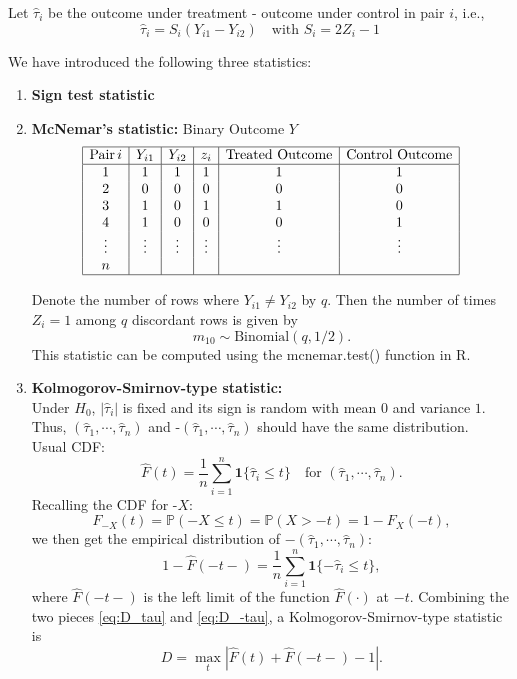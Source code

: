 Let $\hat\tau_i$ be the outcome under treatment - outcome under control in pair $i$, i.e.,
    \[
        \hat\tau_i = S_i (Y_{i1} - Y_{i2}) \quad\text{with }S_i = 2Z_i - 1
    \]

We have introduced the following three statistics:

\begin{enumerate}
    \item \textbf{Sign test statistic}
    
    \item \textbf{McNemar's statistic:} Binary Outcome $Y$
    \[
    \begin{array}{|c|c|c|c|c|c|}
    \hline
    \text{Pair} \, i & Y_{i1} & Y_{i2} & z_i & \text{Treated Outcome} & \text{Control Outcome} \\
    \hline
    1 & 1 & 1 & 1 & 1 & 1 \\
    2 & 0 & 0 & 0 & 0 & 0 \\
    3 & 1 & 0 & 1 & 1 & 0 \\
    4 & 1 & 0 & 0 & 0 & 1 \\
    \vdots & \vdots & \vdots & \vdots & \vdots & \vdots \\
    n & & & & &\\
    \hline
    \end{array}
    \]

    Denote the number of rows where $Y_{i1} \neq Y_{i2}$ by $q$. Then the number of times $Z_i=1$ among $q$ discordant rows is given by
    \[
        m_{10} \sim \text{Binomial}(q, 1/2).
    \]
    This statistic can be computed using the mcnemar.test() function in R.

    \item \textbf{Kolmogorov-Smirnov-type statistic:}\\
    Under $H_0$, $|\hat\tau_i|$ is fixed and its sign is random with mean $0$ and variance $1$. Thus, $(\hat\tau_1, \cdots, \hat\tau_n)$ and -$(\hat\tau_1, \cdots, \hat\tau_n)$ should have the same distribution.\\
    Usual CDF:
    \begin{equation}\label{eq:D_tau}
        \widehat F(t) = \frac{1}{n} \sum^n_{i=1} \mathbf{1} \{\hat\tau_i \leq t\} \quad\text{for }(\hat\tau_1, \cdots, \hat\tau_n).
    \end{equation}
    Recalling the CDF for -$X$:
    \[
        F_{-X}(t) = \mathbb{P}(-X \leq t) = \mathbb{P}(X > -t) = 1 - F_X(-t),
    \]
    we then get the empirical distribution of $-(\hat\tau_1, \cdots, \hat\tau_n)$:
    \begin{equation}\label{eq:D_-tau}
        1 - \widehat F(-t-) = \frac{1}{n} \sum^{n}_{i=1} \mathbf{1} \{-\hat\tau_i \leq t\},
    \end{equation}
    where $\widehat F(-t-)$ is the left limit of the function $\widehat F(\cdot)$ at $-t$. Combining the two pieces \eqref{eq:D_tau} and \eqref{eq:D_-tau}, a Kolmogorov-Smirnov-type statistic is
    \[
        D = \max_t \left|\widehat F(t) + \widehat F(-t-) - 1\right|.
    \]
\end{enumerate}



